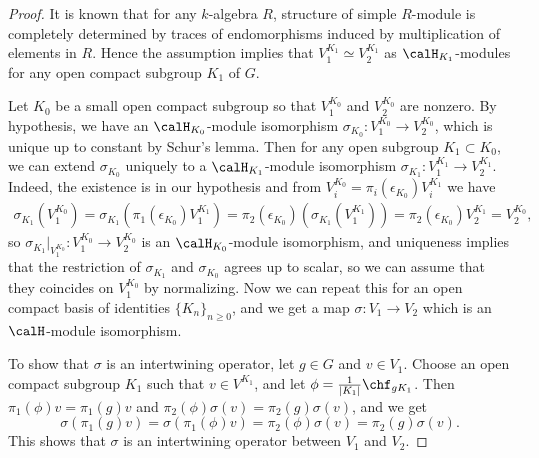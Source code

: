 \documentclass{article}
\begin{document}
\begin{proof}
It is known that for any $k$-algebra $R$, structure of simple $R$-module is completely determined by traces of endomorphisms induced by multiplication of elements in $R$. Hence the assumption implies that $V_{1}^{K_{1}}\simeq V_{2}^{K_{1}}$ as $\calH_{K_{1}}$-modules for any open compact subgroup $K_{1}$ of $G$. 

Let $K_{0}$ be a small open compact subgroup so that $V_{1}^{K_{0}}$ and $V_{2}^{K_{0}}$ are nonzero. 
By hypothesis, we have an  $\calH_{K_{0}}$-module isomorphism $\sigma_{K_{0}}:V_{1}^{K_{0}}\to V_{2}^{K_{0}}$, which is unique up to constant by Schur's lemma.  
Then for any open subgroup $K_{1} \subset K_{0}$, we can extend $\sigma_{K_{0}}$ uniquely to a $\calH_{K_{1}}$-module isomorphism $\sigma_{K_{1}}:V_{1}^{K_{1}}\to V_{2}^{K_{1}}$.
Indeed, the existence is in our hypothesis and from $V_{i}^{K_{0}} = \pi_{i}(\epsilon_{K_{0}}) V_{i}^{K_{1}}$ we have
\begin{align*}
\sigma_{K_{1}}(V_{1}^{K_{0}}) = \sigma_{K_{1}}(\pi_{1}(\epsilon_{K_{0}})V_{1}^{K_{1}}) = \pi_{2}(\epsilon_{K_{0}}) (\sigma_{K_{1}}(V_{1}^{K_{1}})) = \pi_{2}(\epsilon_{K_{0}}) V_{2}^{K_{1}} = V_{2}^{K_{0}},
\end{align*}
so $\sigma_{K_{1}}|_{V_{1}^{K_{0}}} : V_{1}^{K_{0}} \to V_{2}^{K_{0}}$ is an $\calH_{K_{0}}$-module isomorphism, and uniqueness implies that the restriction of $\sigma_{K_{1}}$ and $\sigma_{K_{0}}$ agrees up to scalar, so we can assume that they coincides on $V_{1}^{K_{0}}$ by normalizing. 
Now we can repeat this for an open compact basis of identities $\{K_{n}\}_{n\geq 0}$, and we get a map $\sigma:V_{1}\to V_{2}$ which is an $\calH$-module isomorphism. 

To show that $\sigma$ is an intertwining operator, let $g\in G$ and $v\in V_{1}$. Choose an open compact subgroup $K_{1}$ such that $v\in V^{K_{1}}$, and let $\phi = \frac{1}{|K_{1}|} \chf_{gK_{1}}$. 
Then $\pi_{1}(\phi)v = \pi_{1}(g)v$ and $\pi_{2}(\phi)\sigma(v)= \pi_{2}(g)\sigma(v)$, and we get
$$
\sigma(\pi_{1}(g)v) = \sigma(\pi_{1}(\phi)v) = \pi_{2}(\phi)\sigma(v) = \pi_{2}(g)\sigma(v). 
$$
This shows that $\sigma$ is an intertwining operator between $V_{1}$ and $V_{2}$. 
\end{proof}
\end{document}

